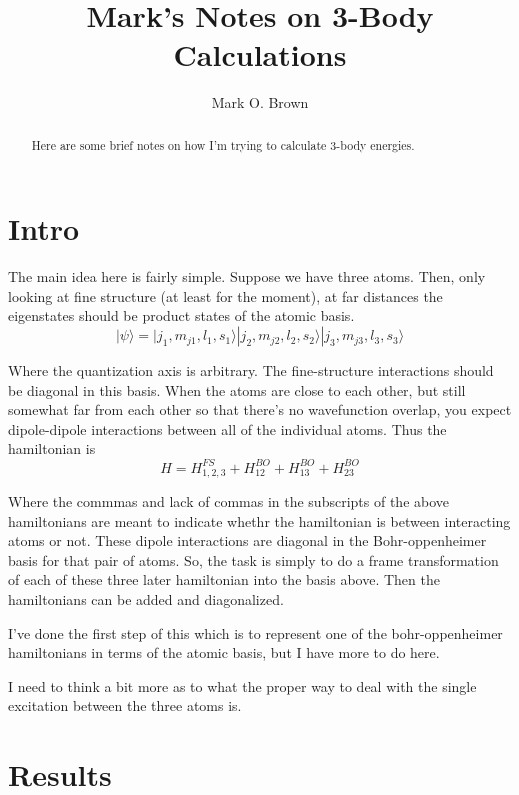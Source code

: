 \documentclass[prl, longbibliography, aps, 10pt]{revtex4-2}
\begin{document}
\title{Mark's Notes on 3-Body Calculations}
\author{Mark O. Brown}

\begin{abstract}
Here are some brief notes on how I'm trying to calculate 3-body energies.
\end{abstract}

\maketitle

\section{Intro}

The main idea here is fairly simple. Suppose we have three atoms. Then, only looking at fine structure (at least for the moment), at far distances the eigenstates should be product states of the atomic basis.
\begin{equation}
|\psi\rangle = |j_1,m_{j1}, l_1, s_1\rangle|j_2,m_{j2}, l_2, s_2\rangle|j_3,m_{j3}, l_3, s_3\rangle
\end{equation}

Where the quantization axis is arbitrary. The fine-structure interactions should be diagonal in this basis. When the atoms are close to each other, but still somewhat far from each other so that there's no wavefunction overlap, you expect dipole-dipole interactions between all of the individual atoms. Thus the hamiltonian is
\begin{equation}
H = H_{1,2,3}^{FS} + H^{BO}_{12}+H^{BO}_{13}+H^{BO}_{23}
\end{equation}

Where the commmas and lack of commas in the subscripts of the above hamiltonians are meant to indicate whethr the hamiltonian is between interacting atoms or not. These dipole interactions are diagonal in the Bohr-oppenheimer basis for that pair of atoms. So, the task is simply to do a frame transformation of each of these three later hamiltonian into the basis above. Then the hamiltonians can be added and diagonalized.

I've done the first step of this which is to represent one of the bohr-oppenheimer hamiltonians in terms of the atomic basis, but I have more to do here. 

I need to think a bit more as to what the proper way to deal with the single excitation between the three atoms is.

%
\section{Results}
%



\end{document}
